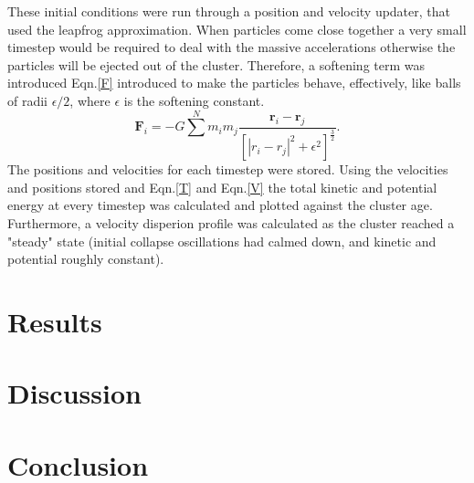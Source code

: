 \documentclass{article}
\begin{document}
\begin{multicols}{2}
These initial conditions were run through a position and velocity updater, that used the leapfrog approximation. When particles come close together a very small timestep would be required to deal with the massive accelerations otherwise the particles will be ejected out of the cluster. Therefore, a softening term was introduced Eqn.\ref{F} introduced to make the particles behave, effectively, like balls of radii $\epsilon/2$, where $\epsilon$ is the softening constant.
\begin{equation}
    \textbf{F}_{i} = -G \sum^N m_i m_j \frac{\textbf{r}_i - \textbf{r}_j} {[|r_i-r_j|^2+\epsilon^2]^\frac{3}{2}}.
    \label{softened}
\end{equation}
The positions and velocities for each timestep were stored. Using the velocities and positions stored and Eqn.\ref{T} and Eqn.\ref{V}  the total kinetic and potential energy at every timestep was calculated and plotted against the cluster age. Furthermore, a velocity disperion profile was calculated as the cluster reached a "steady" state (initial collapse oscillations had calmed down, and kinetic and potential roughly constant). 

\section{Results}


\section{Discussion}


\section{Conclusion}






\end{multicols}
\end{document}
